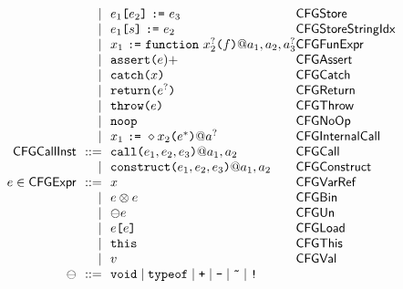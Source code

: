 \[\begin{array}{r@{~~}r@{~~}l@{}ll}
& \mid & e_1\verb+[+e_2\verb+]+ ~\verb+:=+~ e_3
 & \SF{CFGStore}
\\

& \mid & e_1\verb+[+s\verb+]+ ~\verb+:=+~ e_2
 & \SF{CFGStoreStringIdx}
\\

& \mid & x_1 ~\verb+:=+~ \TT{function} ~x_2^{?}\verb+(+f\verb+)+ @ a_1, a_2, a_3^{?}
 & \SF{CFGFunExpr}
\\

& \mid & \TT{assert}\verb+(+e)+
 & \SF{CFGAssert}
\\

& \mid & \TT{catch}\verb+(+x\verb+)+
 & \SF{CFGCatch}
\\

& \mid & \TT{return}\verb+(+e^{?}\verb+)+ 
 & \SF{CFGReturn}
\\

& \mid & \TT{throw}\verb+(+e\verb+)+
 & \SF{CFGThrow}
\\

& \mid & \TT{noop}
 & \SF{CFGNoOp}
\\

& \mid & x_1 ~\verb+:=+~\ensuremath{\diamond}x_2\verb+(+e^{*}\verb+)+ @ a^{?}
 & \SF{CFGInternalCall}
\\

\CFGCallInst & ::= & \TT{call}\verb+(+e_1,e_2,e_3\verb+)+ @ a_1, a_2
 & \SF{CFGCall}
\\

& \mid & \TT{construct}\verb+(+e_1,e_2,e_3\verb+)+ @ a_1, a_2
 & \SF{CFGConstruct}
\\

e \in \CFGExpr & ::= & x
 & \SF{CFGVarRef}
\\

& \mid & e \inop e 
 & \SF{CFGBin}
\\

& \mid & \preop e
 & \SF{CFGUn}
\\

& \mid & e\verb+[+e\verb+]+
 & \SF{CFGLoad}
\\

& \mid & \TT{this}
 & \SF{CFGThis}
\\

& \mid & v
 & \SF{CFGVal}
\\

 \preop & ::= &
\multicolumn{2}{@{} l}{
 \TT{void} \mid \TT{typeof} \mid \TT{+} \mid \TT{-} \mid \TT{\~} \mid \TT{!}}
\\


\end{array}\]
